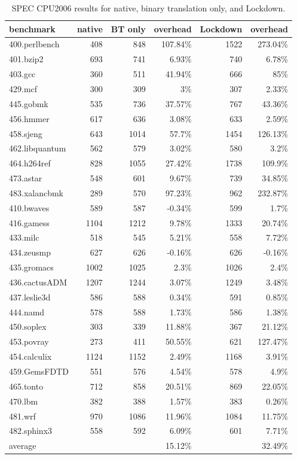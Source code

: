 \documentclass{acm_proc_article-sp}
\begin{document}
\begin{table*}[t!]
\begin{center}
  \begin{tabular}{  l | r || r | r || r | r }
benchmark & native & BT only & overhead & Lockdown & overhead \\ \hline
  400.perlbench & 408 & 848 & 107.84\% & 1522 & 273.04\%\\
  401.bzip2 & 693 & 741 & 6.93\% & 740 & 6.78\%\\ 
  403.gcc & 360 & 511 & 41.94\% & 666 & 85\%\\
  429.mcf & 300 & 309 & 3\% & 307 & 2.33\%\\
  445.gobmk & 535 & 736 & 37.57\% & 767 & 43.36\%\\
  456.hmmer & 617 & 636 & 3.08\% & 633 & 2.59\%\\ 
  458.sjeng & 643 & 1014 & 57.7\% & 1454 & 126.13\%\\ 
  462.libquantum & 562 & 579 & 3.02\% & 580 & 3.2\%\\
  464.h264ref & 828 & 1055 & 27.42\% & 1738 & 109.9\%\\
473.astar & 548 & 601 & 9.67\% & 739 & 34.85\%\\
  483.xalancbmk & 289 & 570 & 97.23\% & 962 & 232.87\%\\
  410.bwaves & 589 & 587 & -0.34\% & 599 & 1.7\%\\
  416.gamess & 1104 & 1212 & 9.78\% & 1333 & 20.74\%\\
  433.milc & 518 & 545 & 5.21\% & 558 & 7.72\%\\
  434.zeusmp & 627 & 626 & -0.16\% & 626 & -0.16\%\\
  435.gromacs & 1002 & 1025 & 2.3\% & 1026 & 2.4\%\\ 
  436.cactusADM & 1207 & 1244 & 3.07\% & 1249 & 3.48\%\\
  437.leslie3d & 586 & 588 & 0.34\% & 591 & 0.85\%\\
  444.namd & 578 & 588 & 1.73\% & 586 & 1.38\%\\ 
450.soplex & 303 & 339 & 11.88\% & 367 & 21.12\%\\ 
  453.povray & 273 & 411 & 50.55\% & 621 & 127.47\%\\
  454.calculix & 1124 & 1152 & 2.49\% & 1168 & 3.91\%\\ 
  459.GemsFDTD & 551 & 576 & 4.54\% & 578 & 4.9\%\\ 
  465.tonto & 712 & 858 & 20.51\% & 869 & 22.05\%\\ 
  470.lbm & 382 & 388 & 1.57\% & 383 & 0.26\%\\ 
  481.wrf & 970 & 1086 & 11.96\% & 1084 & 11.75\%\\ 
  482.sphinx3 & 558 & 592 & 6.09\% & 601 & 7.71\%\\ 
  \hline
  average &  &  & 15.12\% &  & 32.49\%\\
\end{tabular}
\caption{SPEC CPU2006 results for native, binary translation only, and
  Lockdown.} 
	\label{tbl:spec} 
\end{center}
\end{table*}
\end{document}
